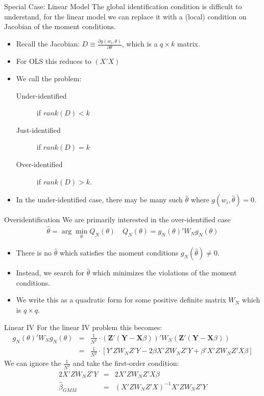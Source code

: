 \documentclass[aspectratio=169]{beamer}
\begin{document}
\begin{frame}{Special Case: Linear Model}
The global identification condition is difficult to understand, for the linear model we can replace it with a (local) condition on Jacobian of the moment conditions. 
\begin{itemize}
\item Recall the Jacobian: $D \equiv \frac{\partial g(w_i,\theta)}{\partial \theta}$, which is a $q \times k$ matrix.
\item For OLS this reduces to $(X'X)$
\item We call the problem:
\begin{description}
\item[Under-identified] if $rank(D) < k$
\item[Just-identified] if $rank(D) = k$
\item[Over-identified] if $rank(D) > k$. 
\end{description}
\item In the under-identified case, there may be many such $\hat{\theta}$ where $g(w_i,\hat{\theta}) =0$. 
\end{itemize}
\end{frame}

\begin{frame}{Overidentification}
We are primarily interested in the \alert{over-identified case} 
\begin{eqnarray*}
\hat{\theta} = \arg \min_{\theta}  Q_N(\theta) \quad Q_N(\theta)=g_N(\theta)' W_N  g_N(\theta)
\end{eqnarray*}
\begin{itemize} 
\item There is no $\hat{\theta}$ which satisfies the moment conditions $g_N(\hat{\theta})\neq0$.
\item Instead, we search for $\hat{\theta}$ which minimizes the violations of the moment conditions. 
\item We write this as a quadratic form for some positive definite matrix $W_N$ which is $q \times q$.
\end{itemize}
\end{frame}

\begin{frame}{Linear IV}
For the linear IV problem this becomes:
\begin{eqnarray*}
g_N(\theta)' W_N  g_N(\theta) &=& \frac{1}{N^2} \cdot (\mathbf{Z}' (\mathbf{Y} - \mathbf{X} \beta))' W_N (\mathbf{Z}' (\mathbf{Y} - \mathbf{X} \beta)) \\
&=& \frac{1}{N^2}\cdot [Y'Z W_N Z' Y - 2 \beta X' Z W_N Z' Y + \beta' X' Z W_N Z' X \beta]
\end{eqnarray*}
We can ignore the $\frac{1}{N^2}$ and take the first-order condition:
\begin{eqnarray*}
2 X'Z W_N Z' Y &=& 2 X'Z W_N Z' X \beta\\
\hat{\beta}_{GMM} &=& (X'Z W_N Z' X)^{-1} X' Z W_N Z'Y
\end{eqnarray*}
\end{frame}
\end{document}
